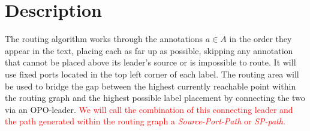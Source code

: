 \documentclass[11pt,a4paper]{vutinfth}
\newcommand{\change}[1]{\textcolor{red}{#1}}
\begin{document}


\section{Description}

The routing algorithm works through the annotations $a \in A$ in the order they appear in the text, placing each as far up as possible, skipping any annotation that cannot be placed above its leader's source or is impossible to route. It will use fixed ports located in the top left corner of each label. 
The routing area will be used to bridge the gap between the highest currently reachable point within the routing graph and the highest possible label placement by connecting the two via an OPO-leader. \change{We will call the combination of this connecting leader and the path generated within the routing graph a \emph{Source-Port-Path} or \emph{SP-path}.}%
\end{document}
